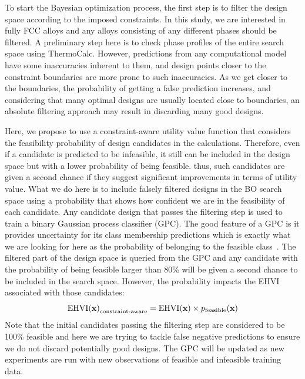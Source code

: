 To start the Bayesian optimization process, the first step is to filter the design space according to the imposed constraints. In this study, we are interested in fully FCC alloys and any alloys consisting of any different phases should be filtered. A preliminary step here is to check phase profiles of the entire search space using ThermoCalc. However, predictions from any computational model have some inaccuracies inherent to them, and design points closer to the constraint boundaries are more prone to such inaccuracies. As we get closer to the boundaries, the probability of getting a false prediction increases, and considering that many optimal designs are usually located close to boundaries, an absolute filtering approach may result in discarding many good designs.

Here, we propose to use a constraint-aware utility value function that considers the feasibility probability of design candidates in the calculations. Therefore, even if a candidate is predicted to be infeasible, it still can be included in the design space but with a lower probability of being feasible. thus, such candidates are given a second chance if they suggest significant improvements in terms of utility value. What we do here is to include falsely filtered designs in the BO search space using a probability that shows how confident we are in the feasibility of each candidate. Any candidate design that passes the filtering step is used to train a binary Gaussian process classifier (GPC). The good feature of a GPC is it provides uncertainty for its class membership predictions which is exactly what we are looking for here as the probability of belonging to the feasible class~\cite{Rasmussen:2005:GPM:1162254}. The filtered part of the design space is queried from the GPC and any candidate with the probability of being feasible larger than 80\% will be given a second chance to be included in the search space. However, the probability impacts the EHVI associated with those candidates:
\begin{equation}
    \textrm{EHVI(\textbf{x})}_{\textrm{constraint-aware}} = \textrm{EHVI}(\textbf{x})\times p_{\textrm{feasible}}(\textbf{x})
\end{equation}
Note that the initial candidates passing the filtering step are considered to be 100\% feasible and here we are trying to tackle false negative predictions to ensure we do not discard potentially good designs. The GPC will be updated as new experiments are run with new observations of feasible and infeasible training data.

